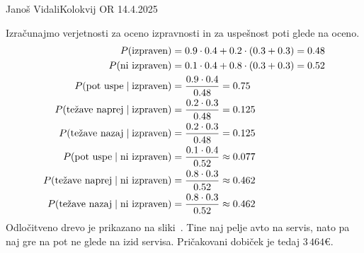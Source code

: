 \begin{naloga}{Janoš Vidali}{Kolokvij OR 14.4.2025}
\begin{odgovor}
Izračunajmo verjetnosti za oceno izpravnosti
in za uspešnost poti glede na oceno.
\begin{align*}
P(\text{izpraven}) &= 0.9 \cdot 0.4 + 0.2 \cdot (0.3 + 0.3) = 0.48 \\
P(\text{ni izpraven}) &= 0.1 \cdot 0.4 + 0.8 \cdot (0.3 + 0.3) = 0.52 \\
P(\text{pot uspe} \mid \text{izpraven})
&= {0.9 \cdot 0.4 \over 0.48} = 0.75 \\
P(\text{težave naprej} \mid \text{izpraven})
&= {0.2 \cdot 0.3 \over 0.48} = 0.125 \\
P(\text{težave nazaj} \mid \text{izpraven})
&= {0.2 \cdot 0.3 \over 0.48} = 0.125 \\
P(\text{pot uspe} \mid \text{ni izpraven})
&= {0.1 \cdot 0.4 \over 0.52} \approx 0.077 \\
P(\text{težave naprej} \mid \text{ni izpraven})
&= {0.8 \cdot 0.3 \over 0.52} \approx 0.462 \\
P(\text{težave nazaj} \mid \text{ni izpraven})
&= {0.8 \cdot 0.3 \over 0.52} \approx 0.462
\end{align*}
Odločitveno drevo je prikazano na sliki~\fig.
Tine naj pelje avto na servis,
nato pa naj gre na pot ne glede na izid servisa.
Pričakovani dobiček je tedaj $3\,464 €$.
\begin{slika}[p]
\makebox[\textwidth][c]{
\pgfslika
}
\end{slika}
\end{odgovor}
\end{naloga}
